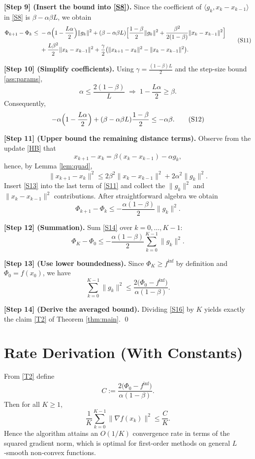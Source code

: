 \documentclass{article}
\begin{document}
\noindent\textbf{[Step 9] (Insert the bound into \eqref{S8}).}  
Since the coefficient of $\langle g_{k},x_{k}-x_{k-1}\rangle$ in \eqref{S8} is $\beta-\alpha\beta L$, we obtain
\[
\begin{aligned}
\Phi_{k+1}-\Phi_{k}
\le &\; -\alpha\Bigl(1-\frac{L\alpha}{2}\Bigr)\|g_{k}\|^{2}
+ (\beta-\alpha\beta L)\Bigl[\frac{1-\beta}{2}\|g_{k}\|^{2}
+\frac{\beta^{2}}{2(1-\beta)}\|x_{k}-x_{k-1}\|^{2}\Bigr] \\
&\; +\frac{L\beta^{2}}{2}\|x_{k}-x_{k-1}\|^{2}
+\frac{\gamma}{2}\bigl(\|x_{k+1}-x_{k}\|^{2}-\|x_{k}-x_{k-1}\|^{2}\bigr).
\end{aligned}
\tag{S11}
\]

\noindent\textbf{[Step 10] (Simplify coefficients).}  
Using $\gamma=\frac{(1-\beta)L}{2}$ and the step‑size bound \eqref{ass:params},
\[
\alpha\le \frac{2(1-\beta)}{L}\;\Longrightarrow\;
1-\frac{L\alpha}{2}\ge \beta.
\]
Consequently,
\[
-\alpha\Bigl(1-\frac{L\alpha}{2}\Bigr)+(\beta-\alpha\beta L)\frac{1-\beta}{2}
\le -\alpha\beta .
\tag{S12}
\]

\noindent\textbf{[Step 11] (Upper bound the remaining distance terms).}  
Observe from the update \eqref{HB} that
\[
x_{k+1}-x_{k}= \beta (x_{k}-x_{k-1})-\alpha g_{k},
\]
hence, by Lemma \ref{lem:quad},
\[
\|x_{k+1}-x_{k}\|^{2}
\le 2\beta^{2}\|x_{k}-x_{k-1}\|^{2}+2\alpha^{2}\|g_{k}\|^{2}.
\tag{S13}
\]
Insert \eqref{S13} into the last term of \eqref{S11} and collect the $\|g_{k}\|^{2}$ and $\|x_{k}-x_{k-1}\|^{2}$ contributions. After straightforward algebra we obtain
\[
\Phi_{k+1}-\Phi_{k}
\le -\frac{\alpha(1-\beta)}{2}\|g_{k}\|^{2}.
\tag{S14}
\]

\noindent\textbf{[Step 12] (Summation).}  
Sum \eqref{S14} over $k=0,\dots,K-1$:
\[
\Phi_{K}-\Phi_{0}\le -\frac{\alpha(1-\beta)}{2}\sum_{k=0}^{K-1}\|g_{k}\|^{2}.
\tag{S15}
\]

\noindent\textbf{[Step 13] (Use lower boundedness).}  
Since $\Phi_{K}\ge f^{\inf}$ by definition and $\Phi_{0}=f(x_{0})$, we have
\[
\sum_{k=0}^{K-1}\|g_{k}\|^{2}
\le \frac{2\bigl(\Phi_{0}-f^{\inf}\bigr)}{\alpha(1-\beta)}.
\tag{S16}
\]

\noindent\textbf{[Step 14] (Derive the averaged bound).}  
Dividing \eqref{S16} by $K$ yields exactly the claim \eqref{T2} of Theorem \ref{thm:main}. \hfill\qed

\section*{Rate Derivation (With Constants)}
From \eqref{T2} define
\[
C:=\frac{2\bigl(\Phi_{0}-f^{\inf}\bigr)}{\alpha(1-\beta)}.
\]
Then for all $K\ge1$,
\[
\frac{1}{K}\sum_{k=0}^{K-1}\|\nabla f(x_{k})\|^{2}\le \frac{C}{K}.
\]
Hence the algorithm attains an $O(1/K)$ convergence rate in terms of the squared gradient norm, which is optimal for first‑order methods on general $L$‑smooth non‑convex functions.
\end{document}
